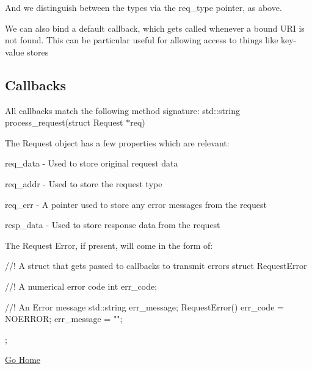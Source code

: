 And we distinguish between the types via the req\+\_\+type pointer, as above.

We can also bind a default callback, which get\textquotesingle{}s called whenever a bound U\+RI is not found. This can be particular useful for allowing access to things like key-\/value stores

\subsection*{Callbacks}

All callbacks match the following method signature\+: std\+::string process\+\_\+request(struct Request $\ast$req)

The Request object has a few properties which are relevant\+:


\begin{DoxyItemize}
\item req\+\_\+data -\/ Used to store original request data
\item req\+\_\+addr -\/ Used to store the request type
\item req\+\_\+err -\/ A pointer used to store any error messages from the request
\item resp\+\_\+data -\/ Used to store response data from the request
\end{DoxyItemize}

The Request Error, if present, will come in the form of\+: \begin{DoxyVerb}//! A struct that gets passed to callbacks to transmit errors
struct RequestError
{
  //! A numerical error code
  int err_code;

  //! An Error message
  std::string err_message;
  RequestError() {err_code = NOERROR; err_message = "";}
};
\end{DoxyVerb}


\hyperlink{index}{Go Home} 
